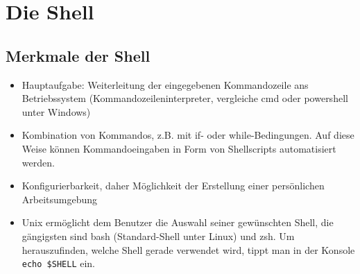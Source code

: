 \documentclass[11pt]{article}
\begin{document}
\section{Die Shell}
\subsection{Merkmale der Shell}
\begin{itemize}
\item Hauptaufgabe: Weiterleitung der eingegebenen Kommandozeile ans
Betriebssystem (Kommandozeileninterpreter, vergleiche cmd oder powershell unter Windows)
\item Kombination von Kommandos, z.B. mit if- oder while-Bedingungen.
Auf diese Weise können Kommandoeingaben in Form von Shellscripts
automatisiert werden.
\item Konfigurierbarkeit, daher Möglichkeit der Erstellung einer
persönlichen Arbeitsumgebung
\item Unix ermöglicht dem Benutzer die Auswahl seiner gewünschten Shell,
die gängigsten sind bash (Standard-Shell unter Linux) und zsh.  Um herauszufinden, welche Shell gerade verwendet wird, tippt
man in der Konsole \texttt{echo \$SHELL} ein.
\end{itemize}
\end{document}
